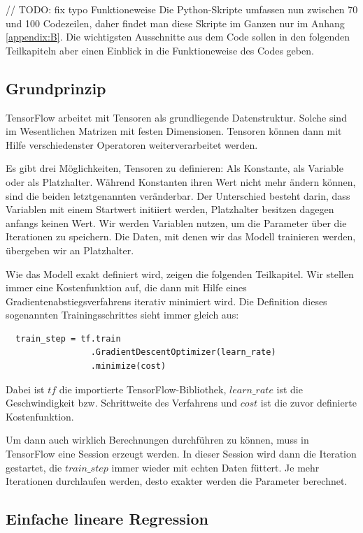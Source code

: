 // TODO: fix typo Funktioneweise
Die Python-Skripte umfassen nun zwischen 70 und 100 Codezeilen, daher findet man diese Skripte im Ganzen nur im Anhang \ref{appendix:B}. Die wichtigsten Ausschnitte aus dem Code sollen in den folgenden Teilkapiteln aber einen Einblick in die Funktioneweise des Codes geben.

\subsection{Grundprinzip}
\label{subsection:3:3:1}

TensorFlow arbeitet mit Tensoren als grundliegende Datenstruktur. Solche sind im Wesentlichen Matrizen mit festen Dimensionen. Tensoren können dann mit Hilfe verschiedenster Operatoren weiterverarbeitet werden.

Es gibt drei Möglichkeiten, Tensoren zu definieren: Als Konstante, als Variable oder als Platzhalter. Während Konstanten ihren Wert nicht mehr ändern können, sind die beiden letztgenannten veränderbar. Der Unterschied besteht darin, dass Variablen mit einem Startwert initiiert werden, Platzhalter besitzen dagegen anfangs keinen Wert. Wir werden Variablen nutzen, um die Parameter über die Iterationen zu speichern. Die Daten, mit denen wir das Modell trainieren werden, übergeben wir an Platzhalter.

Wie das Modell exakt definiert wird, zeigen die folgenden Teilkapitel. Wir stellen immer eine Kostenfunktion auf, die dann mit Hilfe eines Gradientenabstiegsverfahrens iterativ minimiert wird. Die Definition dieses sogenannten Trainingsschrittes sieht immer gleich aus:

\begin{verbatim}
  train_step = tf.train
                 .GradientDescentOptimizer(learn_rate)
                 .minimize(cost)
\end{verbatim}

Dabei ist $tf$ die importierte TensorFlow-Bibliothek, $learn\_rate$ ist die Geschwindigkeit bzw. Schrittweite des Verfahrens und $cost$ ist die zuvor definierte Kostenfunktion.

Um dann auch wirklich Berechnungen durchführen zu können, muss in TensorFlow eine Session erzeugt werden. In dieser Session wird dann die Iteration gestartet, die $train\_step$ immer wieder mit echten Daten füttert. Je mehr Iterationen durchlaufen werden, desto exakter werden die Parameter berechnet.

\subsection{Einfache lineare Regression}
\label{subsection:3:3:2}

